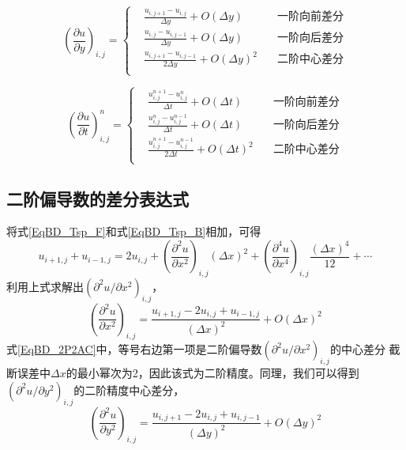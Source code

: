 \begin{equation}
  \left(
    \frac{\partial u}{\partial y}
  \right)_{i,j}
  =
  \left\{
    \begin{aligned}
      &\frac{u_{i,j+1}-u_{i,j}}{\Delta y} + O(\Delta y) & \mbox{一阶向前差分} \\
      &\frac{u_{i,j}-u_{i,j-1}}{\Delta y} + O(\Delta y) & \mbox{一阶向后差分} \\
      &\frac{u_{i,j+1}-u_{i,j-1}}{2\Delta y} + O(\Delta y)^{2} \quad& \mbox{二阶中心差分} \\
    \end{aligned}
  \right.
\end{equation}

\begin{equation}
  \left(
    \frac{\partial u}{\partial t}
  \right)_{i,j}^{n}
  =
  \left\{
    \begin{aligned}
      &\frac{u_{i,j}^{n+1}-u_{i,j}^{n}}{\Delta t} + O(\Delta t) & \mbox{一阶向前差分} \\
      &\frac{u_{i,j}^{n}-u_{i,j}^{n-1}}{\Delta t} + O(\Delta t) & \mbox{一阶向后差分} \\
      &\frac{u_{i,j}^{n+1}-u_{i,j}^{n-1}}{2\Delta t} + O(\Delta t)^{2} \quad& \mbox{二阶中心差分} \\
    \end{aligned}
  \right.
\end{equation}


\subsection{二阶偏导数的差分表达式}
将式\eqref{EqBD_Tsp_F}和式\eqref{EqBD_Tsp_B}相加，可得
\begin{equation}
  u_{i+1,j} + u_{i-1,j}
  =
  2u_{i,j}+
  \left(
    \frac{\partial^{2} u}{\partial x^{2}}
  \right)_{i,j}(\Delta x)^{2}
  +
  \left(
    \frac{\partial^{4} u}{\partial x^{4}}
  \right)_{i,j}\frac{(\Delta x)^{4}}{12}
  +
  \cdots
\end{equation}
利用上式求解出$(\partial^{2}u/\partial x^{2})_{i,j}$，
\begin{equation}
  \left(
    \frac{\partial^{2} u}{\partial x^{2}} 
  \right)_{i,j}
  =
  \frac{u_{i+1,j}-2u_{i,j}+u_{i-1,j}}{(\Delta x)^{2}}
  +
  O(\Delta x)^2
  \label{EqBD_2P2AC}
\end{equation}
式\eqref{EqBD_2P2AC}中，等号右边第一项是二阶偏导数$(\partial^{2}u/\partial x^{2})_{i,j}$的中心差分
截断误差中$\Delta x$的最小幂次为2，因此该式为二阶精度。同理，我们可以得到
$(\partial^{2}u/\partial y^{2})_{i,j}$的二阶精度中心差分，
\begin{equation}
  \left(
    \frac{\partial^{2} u}{\partial y^{2}} 
  \right)_{i,j}
  =
  \frac{u_{i,j+1}-2u_{i,j}+u_{i,j-1}}{(\Delta y)^{2}}
  +
  O(\Delta y)^2
  \label{EqBD_2Py2AC}
\end{equation}

